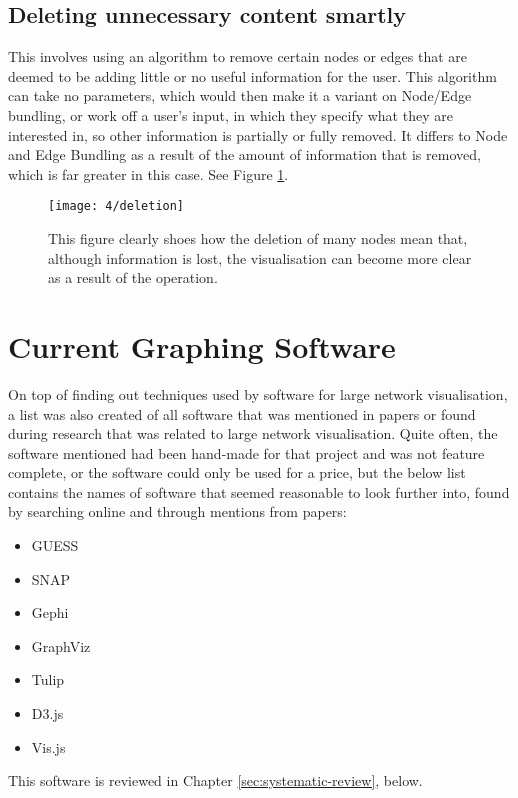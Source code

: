 \documentclass[../dissertation.tex]{subfiles}
\begin{document}
\subsection{Deleting unnecessary content smartly}
This involves using an algorithm to remove certain nodes or edges that are deemed to be adding little or no useful information for the user. This algorithm can take no parameters, which would then make it a variant on Node/Edge bundling, or work off a user's input, in which they specify what they are interested in, so other information is partially or fully removed. It differs to Node and Edge Bundling as a result of the amount of information that is removed, which is far greater in this case. See Figure \ref{fig:deletion}. 
\begin{figure}
    \centering
    \texttt{[image: 4/deletion]}
    \caption{This figure clearly shoes how the deletion of many nodes mean that, although information is lost, the visualisation can become more clear as a result of the operation. \cite{hu2015visualizing}}
    \label{fig:deletion}
\end{figure}

\section{Current Graphing Software}

On top of finding out techniques used by software for large network visualisation, a list was also created of all software that was mentioned in papers or found during research that was related to large network visualisation. Quite often, the software mentioned had been hand-made for that project and was not feature complete, or the software could only be used for a price, but the below list contains the names of software that seemed reasonable to look further into, found by searching online and through mentions from papers:
\begin{itemize}
    \item GUESS \cite{guess}
    \item SNAP \cite{snap}
    \item Gephi \cite{gephi}
    \item GraphViz \cite{graphviz}
    \item Tulip \cite{tulip}
    \item D3.js \cite{d3}
    \item Vis.js \cite{vis}
\end{itemize}

This software is reviewed in Chapter \ref{sec:systematic-review}, below.
\end{document}
